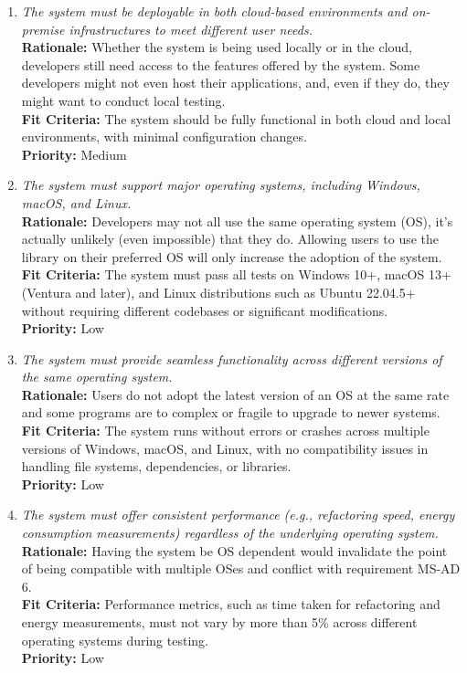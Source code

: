 \documentclass[12pt]{article}
\begin{document}
\begin{enumerate}[label=MS-AD \arabic*., wide=0pt, leftmargin=*]
  \item \emph{The system must be deployable in both cloud-based environments and on-premise infrastructures to meet different user needs.}\\
  {\bf Rationale:} Whether the system is being used locally or in the cloud, developers still need access to the features offered by the system. Some developers might not even host their applications, and, even if they do, they might want to conduct local testing. \\
  {\bf Fit Criteria:} The system should be fully functional in both cloud and local environments, with minimal configuration changes.\\
  {\bf Priority:} Medium

  \item \emph{The system must support major operating systems, including Windows, macOS, and Linux.}\\
  {\bf Rationale:} Developers may not all use the same operating system (OS), it's actually unlikely (even impossible) that they do. Allowing users to use the library on their preferred OS will only increase the adoption of the system.\\
  {\bf Fit Criteria:} The system must pass all tests on Windows 10+, macOS 13+ (Ventura and later), and Linux distributions such as Ubuntu 22.04.5+ without requiring different codebases or significant modifications.\\
  {\bf Priority:} Low

  \item \emph{The system must provide seamless functionality across different versions of the same operating system.}\\
  {\bf Rationale:} Users do not adopt the latest version of an OS at the same rate and some programs are to complex or fragile to upgrade to newer systems.\\
  {\bf Fit Criteria:} The system runs without errors or crashes across multiple versions of Windows, macOS, and Linux, with no compatibility issues in handling file systems, dependencies, or libraries.\\
  {\bf Priority:} Low

  \item \emph{The system must offer consistent performance (e.g., refactoring speed, energy consumption measurements) regardless of the underlying operating system.}\\
  {\bf Rationale:} Having the system be OS dependent would invalidate the point of being compatible with multiple OSes and conflict with requirement MS-AD 6.\\
  {\bf Fit Criteria:} Performance metrics, such as time taken for refactoring and energy measurements, must not vary by more than 5\% across different operating systems during testing.\\
  {\bf Priority:} Low

\end{enumerate}
\end{document}
